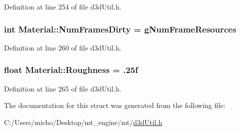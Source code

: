 Definition at line 254 of file d3d\+Util.\+h.

\subsubsection[{\texorpdfstring{Num\+Frames\+Dirty}{NumFramesDirty}}]{\setlength{\rightskip}{0pt plus 5cm}int Material\+::\+Num\+Frames\+Dirty = {\bf g\+Num\+Frame\+Resources}}\hypertarget{struct_material_aacbebebfe577cd18d8652a01e8fae8c0_aacbebebfe577cd18d8652a01e8fae8c0}{}\label{struct_material_aacbebebfe577cd18d8652a01e8fae8c0_aacbebebfe577cd18d8652a01e8fae8c0}


Definition at line 260 of file d3d\+Util.\+h.

\subsubsection[{\texorpdfstring{Roughness}{Roughness}}]{\setlength{\rightskip}{0pt plus 5cm}float Material\+::\+Roughness = .\+25f}\hypertarget{struct_material_a909d7c43062f35668676364d3873449d_a909d7c43062f35668676364d3873449d}{}\label{struct_material_a909d7c43062f35668676364d3873449d_a909d7c43062f35668676364d3873449d}


Definition at line 265 of file d3d\+Util.\+h.



The documentation for this struct was generated from the following file\+:\begin{DoxyCompactItemize}
\item 
C\+:/\+Users/micho/\+Desktop/mt\+\_\+engine/mt/\hyperlink{d3d_util_8h}{d3d\+Util.\+h}\end{DoxyCompactItemize}
